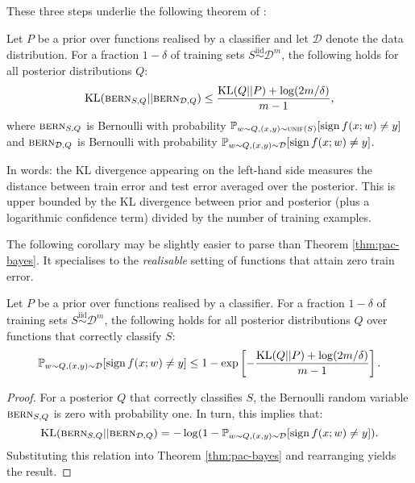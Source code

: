 \begin{refsection}
These three steps underlie the following theorem of \citet{Langford01boundsfor}:

\begin{theorem}\label{thm:pac-bayes}
Let $P$ be a prior over functions realised by a classifier and let $\mathcal{D}$ denote the data distribution. For a fraction $1-\delta$ of training sets $S\overset{\text{iid}}{\sim}\mathcal{D}^m$, the following holds for all posterior distributions $Q$:
\begin{equation}
    \mathrm{KL}(\textsc{bern}_{S,Q}||\textsc{bern}_{\mathcal{D},Q}) \leq \frac{\mathrm{KL}(Q||P) + \log (2m/\delta)}{m-1},
\end{equation}
where $\textsc{bern}_{S,Q}$ is Bernoulli with probability $\mathbb{P}_{w\sim Q, (x,y)\sim\textsc{unif}(S)}[\operatorname{sign} f(x;w)\neq y]$ and $\textsc{bern}_{\mathcal{D},Q}$ is Bernoulli with probability $\mathbb{P}_{w\sim Q, (x,y)\sim\mathcal{D}}[\operatorname{sign} f(x;w)\neq y]$.
\end{theorem}
In words: the KL divergence appearing on the left-hand side measures the distance between train error and test error averaged over the posterior. This is upper bounded by the KL divergence between prior and posterior (plus a logarithmic confidence term) divided by the number of training examples. 

The following corollary may be slightly easier to parse than Theorem \ref{thm:pac-bayes}. It specialises to the \textit{realisable} setting of functions that attain zero train error.

\begin{corollary}\label{cor:pac-bayes}
Let $P$ be a prior over functions realised by a classifier. For a fraction $1-\delta$ of training sets $S\overset{\text{iid}}{\sim}\mathcal{D}^m$, the following holds for all posterior distributions $Q$ over functions that correctly classify $S$:
\begin{equation}\label{eq:pac-bayes-corollary}
\mathbb{P}_{w\sim Q, (x,y)\sim\mathcal{D}}[\operatorname{sign} f(x;w)\neq y] \leq 1 - \exp \left[-\frac{\mathrm{KL}(Q||P) + \log (2m/\delta)}{m-1}\right].
\end{equation}
\end{corollary}
\begin{proof} For a posterior $Q$ that correctly classifies $S$, the Bernoulli random variable $\textsc{bern}_{S,Q}$ is zero with probability one. In turn, this implies that:
\begin{equation*}
    \mathrm{KL}(\textsc{bern}_{S,Q}||\textsc{bern}_{\mathcal{D},Q})= - \log (1-\mathbb{P}_{w\sim Q, (x,y)\sim\mathcal{D}}[\operatorname{sign} f(x;w)\neq y]).
\end{equation*}
Substituting this relation into Theorem \ref{thm:pac-bayes} and rearranging yields the result.
\end{proof}


\end{refsection}
